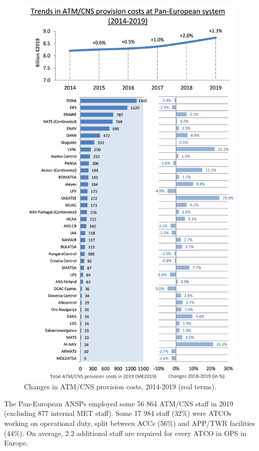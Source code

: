 \documentclass[
]{book}
\begin{document}
\begin{figure}

{\centering \includegraphics[width=1\linewidth]{figures/Figure 2-3} 

}

\caption{Changes in ATM/CNS provision costs, 2014-2019 (real terms).}\label{fig:figure6}
\end{figure}

The Pan-European ANSPs employed some 56 864 ATM/CNS staff in 2019 (excluding 877 internal MET staff). Some 17 984 staff (32\%) were ATCOs working on operational duty, split between ACCs (56\%) and APP/TWR facilities (44\%). On average, 2.2 additional staff are required for every ATCO in OPS in Europe.
\end{document}
